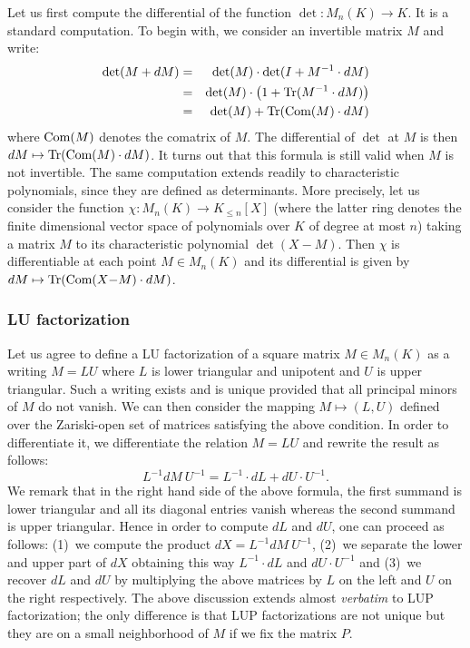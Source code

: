 \documentclass{lms}
\begin{document}
Let us first compute the differential of the function $\det : M_n(K) \to 
K$. It is a standard computation. To begin with, we consider an 
invertible matrix $M$ and write:
\begin{eqnarray*}
\det(M + dM) &=& \det(M) \cdot \det(I + M^{-1} \cdot dM)  \\
&=& \det(M) \cdot \big(1 + \text{\rm Tr}(M^{-1} \cdot dM)\big) \\
&=& \det(M) + \text{\rm Tr}(\text{\rm Com}(M) \cdot dM)
\end{eqnarray*}
where $\text{\rm Com}(M)$ denotes the comatrix of $M$. The differential of 
$\det$ at $M$ is then $dM \mapsto \text{\rm Tr}(\text{\rm Com}(M) \cdot dM)$. It turns
out that this formula is still valid when $M$ is not invertible.
The same computation extends readily to characteristic polynomials,
since they are defined as determinants. More precisely, let us 
consider the function $\chi : M_n(K) \to K_{\leq n}[X]$ (where
the latter ring denotes the finite dimensional vector space of 
polynomials over $K$ of degree at most $n$) taking a matrix $M$
to its characteristic polynomial $\det(X-M)$.
Then $\chi$ is differentiable at each point $M \in M_n(K)$ and its 
differential is given by $dM \mapsto \text{\rm Tr}(\text{\rm Com}(X{-}M) \cdot dM)$.

\subsubsection*{LU factorization}

Let us agree to define a 
LU factorization of a square matrix $M \in M_n(K)$ as a writing $M = LU$ 
where $L$ is lower triangular and unipotent and $U$ is upper triangular. 
Such a writing exists and is unique provided that all principal minors 
of $M$ do not vanish. We can then consider the mapping $M \mapsto (L,U)$ 
defined over the Zariski-open set of matrices satisfying the above 
condition. In order to differentiate it, we differentiate the relation 
$M = LU$ and rewrite the result as follows:
$$L^{-1} dM \: U^{-1} = L^{-1} \cdot dL + dU \cdot U^{-1}.$$
We remark that in the right hand side of the above formula, the first
summand is lower triangular and all its diagonal entries vanish whereas 
the second summand is upper triangular. Hence in order to compute $dL$
and $dU$, one can proceed as follows: (1)~we compute the product $dX = 
L^{-1} dM \: U^{-1}$, (2)~we separate the lower and upper part of $dX$
obtaining this way $L^{-1} \cdot dL$ and $dU \cdot U^{-1}$ and (3)~we
recover $dL$ and $dU$ by multiplying the above matrices by $L$ on the 
left and $U$ on the right respectively. 
The above discussion extends almost \emph{verbatim} to LUP 
factorization; the only difference is that LUP factorizations are not 
unique but they are on a small neighborhood of $M$ if we fix the matrix 
$P$.
\end{document}
